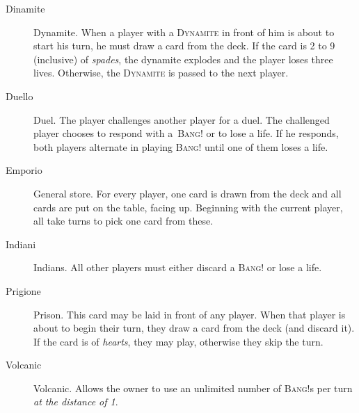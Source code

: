 \documentclass[a4paper,10pt,reqno]{amsart}
\newcommand{\card}[1]{\textsc{#1}}
\newcommand{\col}[1]{\textit{#1}}
\begin{document}
	\begin{description}
		\item[Dinamite] Dynamite. When a player with a \card{Dynamite} in front of him is about
			to start his turn, he must draw a card from the deck. If the card is 2 to 9 (inclusive)
			of \col{spades}, the dynamite explodes and the player loses three lives. Otherwise,
			the \card{Dynamite} is passed to the next player.
		\item[Duello] Duel. The player challenges another player for a duel. The challenged player
			chooses to respond with a~\card{Bang!} or to lose a life. If he responds, both players alternate
			in playing \card{Bang!} until one of them loses a life.
		\item[Emporio] General store. For every player, one card is drawn from the deck and all cards
			are put on the table, facing up. Beginning with the current player, all take turns to pick
			one card from these.
		\item[Indiani] Indians. All other players must either discard a \card{Bang!} or lose a life.
		\item[Prigione] Prison. This card may be laid in front of any player. When that player is about
			to begin their turn, they draw a card from the deck (and discard it). If the card is of
			\col{hearts}, they may play, otherwise they skip the turn.
		\item[Volcanic] Volcanic. Allows the owner to use an unlimited number of \card{Bang!}s per turn
			\col{at the distance of 1}.
	\end{description}
	
\end{document}
